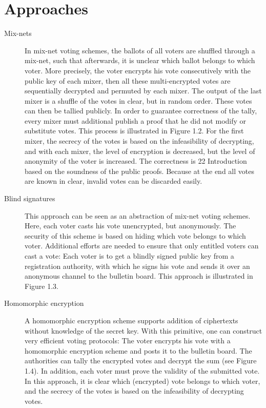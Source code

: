 \section{Approaches}

\begin{description}
    \item[Mix-nets] In mix-net voting schemes, the ballots of all voters are shuffled through a
        mix-net, such that afterwards, it is unclear which ballot belongs to which
        voter. More precisely, the voter encrypts his vote consecutively with the
        public key of each mixer, then all these multi-encrypted votes are sequentially
        decrypted and permuted by each mixer. The output of the
        last mixer is a shuffle of the votes in clear, but in random order. These
        votes can then be tallied publicly. In order to guarantee correctness of the
        tally, every mixer must additional publish a proof that he did not modify
        or substitute votes. This process is illustrated in Figure 1.2.
        For the first mixer, the secrecy of the votes is based on the infeasibility
        of decrypting, and with each mixer, the level of encryption is decreased,
        but the level of anonymity of the voter is increased. The correctness is
        22 Introduction
        based on the soundness of the public proofs. Because at the end all votes
        are known in clear, invalid votes can be discarded easily.
    
    
    \item[Blind signatures] This approach can be seen as an abstraction of mix-net voting            schemes. Here, each voter casts his vote unencrypted, but anonymously. The security
        of this scheme is based on hiding which vote belongs to which voter.
        Additional efforts are needed to ensure that only entitled voters can cast
        a vote: Each voter is to get a blindly signed public key from a registration
        authority, with which he signs his vote and sends it over an anonymous
        channel to the bulletin board. This approach is illustrated in Figure 1.3.
        
        
    \item[Homomorphic encryption] A homomorphic encryption scheme supports addition of               ciphertexts without knowledge of the secret key. With this primitive, one can construct
        very efficient voting protocols: The voter encrypts his vote with a
        homomorphic encryption scheme and posts it to the bulletin board. The
        authorities can tally the encrypted votes and decrypt the sum (see Figure
        1.4). In addition, each voter must prove the validity of the submitted
        vote. In this approach, it is clear which (encrypted) vote belongs to which
        voter, and the secrecy of the votes is based on the infeasibility of decrypting
        votes.
\end{description}
